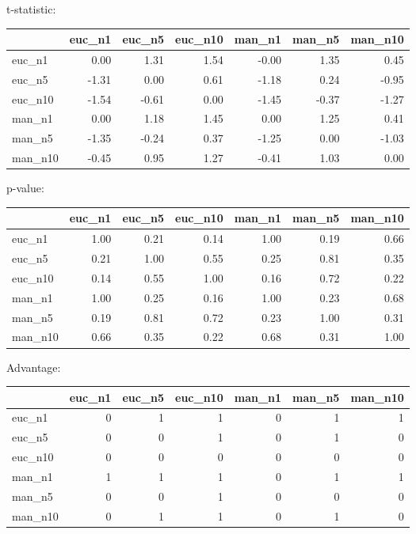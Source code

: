 t-statistic:
 \begin{tabular}{lrrrrrr}
\hline
         &   euc\_n1 &   euc\_n5 &   euc\_n10 &   man\_n1 &   man\_n5 &   man\_n10 \\
\hline
 euc\_n1  &     0.00 &     1.31 &      1.54 &    -0.00 &     1.35 &      0.45 \\
 euc\_n5  &    -1.31 &     0.00 &      0.61 &    -1.18 &     0.24 &     -0.95 \\
 euc\_n10 &    -1.54 &    -0.61 &      0.00 &    -1.45 &    -0.37 &     -1.27 \\
 man\_n1  &     0.00 &     1.18 &      1.45 &     0.00 &     1.25 &      0.41 \\
 man\_n5  &    -1.35 &    -0.24 &      0.37 &    -1.25 &     0.00 &     -1.03 \\
 man\_n10 &    -0.45 &     0.95 &      1.27 &    -0.41 &     1.03 &      0.00 \\
\hline
\end{tabular} 

p-value:
 \begin{tabular}{lrrrrrr}
\hline
         &   euc\_n1 &   euc\_n5 &   euc\_n10 &   man\_n1 &   man\_n5 &   man\_n10 \\
\hline
 euc\_n1  &     1.00 &     0.21 &      0.14 &     1.00 &     0.19 &      0.66 \\
 euc\_n5  &     0.21 &     1.00 &      0.55 &     0.25 &     0.81 &      0.35 \\
 euc\_n10 &     0.14 &     0.55 &      1.00 &     0.16 &     0.72 &      0.22 \\
 man\_n1  &     1.00 &     0.25 &      0.16 &     1.00 &     0.23 &      0.68 \\
 man\_n5  &     0.19 &     0.81 &      0.72 &     0.23 &     1.00 &      0.31 \\
 man\_n10 &     0.66 &     0.35 &      0.22 &     0.68 &     0.31 &      1.00 \\
\hline
\end{tabular} 

Advantage:
 \begin{tabular}{lrrrrrr}
\hline
         &   euc\_n1 &   euc\_n5 &   euc\_n10 &   man\_n1 &   man\_n5 &   man\_n10 \\
\hline
 euc\_n1  &        0 &        1 &         1 &        0 &        1 &         1 \\
 euc\_n5  &        0 &        0 &         1 &        0 &        1 &         0 \\
 euc\_n10 &        0 &        0 &         0 &        0 &        0 &         0 \\
 man\_n1  &        1 &        1 &         1 &        0 &        1 &         1 \\
 man\_n5  &        0 &        0 &         1 &        0 &        0 &         0 \\
 man\_n10 &        0 &        1 &         1 &        0 &        1 &         0 \\
\hline
\end{tabular} 

